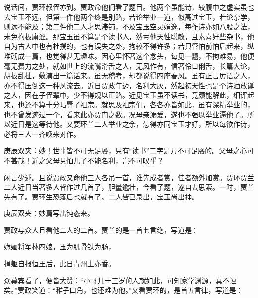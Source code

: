 \begin{parag}
    说话间，贾环叔侄亦到。贾政命他们看了题目。他两个虽能诗，较腹中之虚实虽也去宝玉不远，但第一件他两个终是别路，若论举业一道，似高过宝玉，若论杂学，则远不能及；第二件他二人才思滞钝，不及宝玉空灵娟逸，每作诗亦如八股之法，未免拘板庸涩。那宝玉虽不算是个读书人，然亏他天性聪敏，且素喜好些杂书，他自为古人中也有杜撰的，也有误失之处，拘较不得许多；若只管怕前怕后起来，纵堆砌成一篇，也觉得甚无趣味。因心里怀著这个念头，每见一题，不拘难易，他便毫无费力之处，就如世上的流嘴滑舌之人，无风作有，信著伶口俐舌，长篇大论，胡扳乱扯，敷演出一篇话来。虽无稽考，却都说得四座春风。虽有正言厉语之人，亦不得压倒这一种风流去。近日贾政年迈，名利大灰，然起初天性也是个诗酒放诞之人，因在子侄辈中，少不得规以正路。近见宝玉虽不读书，竟颇能解此，细评起来，也还不算十分玷辱了祖宗。就思及祖宗们，各各亦皆如此，虽有深精举业的，也不曾发迹过一个，看来此亦贾门之数。况母亲溺爱，遂也不强以举业逼他了。所以近日是这等待他。又要环兰二人举业之余，怎得亦同宝玉才好，所以每欲作诗，必将三人一齐唤来对作。\begin{note}庚辰双夹：妙！世事皆不可无足餍，只有“读书”二字是万不可足餍的。父母之心可不甚哉！近之父母只怕儿子不能名利，岂不可叹乎？\end{note}
\end{parag}


\begin{parag}
    闲言少述。且说贾政又命他三人各吊一首，谁先成者赏，佳者额外加赏。贾环贾兰二人近日当著多人皆作过几首了，胆量逾壮，今看了题，遂自去思索。一时，贾兰先有了。贾环生恐落后也就有了。二人皆已录出，宝玉尚出神。\begin{note}庚辰双夹：妙篇写出钝态来。\end{note}贾政与众人且看他二人的二首。贾兰的是一首七言绝，写道是：
\end{parag}


\begin{poem}
    \begin{pl}姽婳将军林四娘，玉为肌骨铁为肠，\end{pl}

    \begin{pl}捐躯自报恒王后，此日青州土亦香。\end{pl}
\end{poem}


\begin{parag}
    众幕宾看了，便皆大赞：“小哥儿十三岁的人就如此，可知家学渊源，真不诬矣。”贾政笑道：“稚子口角，也还难为他。”又看贾环的，是首五言律，写道是：
\end{parag}


